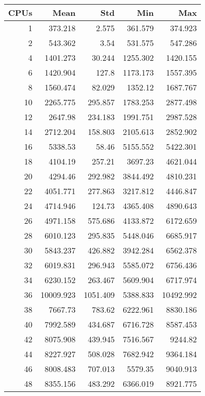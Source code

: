 \begin{table}[htbp]
  \centering
  \begin{minipage}{.45\textwidth}
    \centering
    \scriptsize
\begin{tabular}{rrrrr}
\toprule
\textbf{CPUs} & \textbf{Mean} & \textbf{Std} & \textbf{Min} & \textbf{Max} \\
\midrule
1 & 373.218 & 2.575 & 361.579 & 374.923 \\
2 & 543.362 & 3.54 & 531.575 & 547.286 \\
4 & 1401.273 & 30.244 & 1255.302 & 1420.155 \\
6 & 1420.904 & 127.8 & 1173.173 & 1557.395 \\
8 & 1560.474 & 82.029 & 1352.12 & 1687.767 \\
10 & 2265.775 & 295.857 & 1783.253 & 2877.498 \\
12 & 2647.98 & 234.183 & 1991.751 & 2987.528 \\
14 & 2712.204 & 158.803 & 2105.613 & 2852.902 \\
16 & 5338.53 & 58.46 & 5155.552 & 5422.301 \\
18 & 4104.19 & 257.21 & 3697.23 & 4621.044 \\
20 & 4294.46 & 292.982 & 3844.492 & 4810.231 \\
22 & 4051.771 & 277.863 & 3217.812 & 4446.847 \\
24 & 4714.946 & 124.73 & 4365.408 & 4890.643 \\
26 & 4971.158 & 575.686 & 4133.872 & 6172.659 \\
28 & 6010.123 & 295.835 & 5448.046 & 6685.917 \\
30 & 5843.237 & 426.882 & 3942.284 & 6562.378 \\
32 & 6019.831 & 296.943 & 5585.072 & 6756.436 \\
34 & 6230.152 & 263.467 & 5609.904 & 6717.974 \\
36 & 10009.923 & 1051.409 & 5388.833 & 10492.992 \\
38 & 7667.73 & 783.62 & 6222.961 & 8830.186 \\
40 & 7992.589 & 434.687 & 6716.728 & 8587.453 \\
42 & 8075.908 & 439.945 & 7516.567 & 9244.82 \\
44 & 8227.927 & 508.028 & 7682.942 & 9364.184 \\
46 & 8008.483 & 707.013 & 5579.35 & 9040.913 \\
48 & 8355.156 & 483.292 & 6366.019 & 8921.775 \\
\bottomrule
\end{tabular}


\end{minipage}
\end{table}
